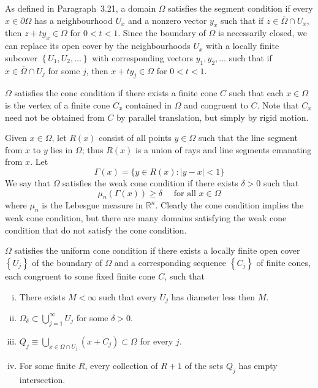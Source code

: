 \begin{para}
  As defined in Paragraph~3.21, a domain $\Omega$ satisfies the segment condition
  if every $x \in\partial\Omega$ has a neighbourhood $U_x$ and a nonzero vector $y_x$
  such that if $z \in \overline{\Omega} \cap U_x$, then $z+t y_x \in \Omega$ for $0<t<1$.
  Since the boundary of $\Omega$ is necessarily closed, we can replace its open cover by the 
  neighbourhoods $U_x$ with a locally finite subcover $\left\{U_1, U_2, \ldots\right\}$ with 
  corresponding vectors $y_1, y_2, \ldots$ such that if $x \in \overline{\Omega} \cap U_j$ for some 
  $j$, then $x+t y_j \in \Omega$ for $0<t<1$.
\end{para}


\begin{para}
  $\Omega$ satisfies the cone condition if there exists a finite cone $C$ such that
  each $x \in \Omega$ is the vertex of a finite cone $C_x$ contained in $\Omega$
  and congruent to $C$. Note that $C_x$ need not be obtained from $C$ by parallel translation,
  but simply by rigid motion.
\end{para}


\begin{para}
  Given $x \in \Omega$, let $R(x)$ consist of all points $y \in \Omega$ such that the line segment
  from $x$ to $y$ lies in $\Omega$; thus $R(x)$ is a union of rays and line segments emanating from $x$. Let
  \[
  \Gamma(x)=\{y \in R(x):|y-x|<1\}
  \]
  We say that $\Omega$ satisfies the weak cone condition if there exists $\delta>0$ such that
  \[
  \mu_n(\Gamma(x)) \geq \delta \quad \text { for all } x \in \Omega
  \]
  where $\mu_n$ is the Lebesgue measure in $\mathbb{R}^n$.
  Clearly the cone condition implies the 
  weak cone condition, but there are many domains satisfying the weak cone condition
  that do not satisfy the cone condition.
\end{para}


\begin{para}
  $\Omega$ satisfies the uniform cone condition if there exists a locally finite open cover
  $\left\{U_j\right\}$ of the boundary of $\Omega$ and a corresponding sequence
  $\left\{C_j\right\}$ of finite cones, each congruent to some fixed finite cone $C$, such that
  \begin{enumerate}[(i)]
    \item There exists $M<\infty$ such that every $U_j$ has diameter less then $M$.
    \item $\Omega_\delta \subset \bigcup_{j=1}^{\infty} U_j$ for some $\delta>0$.
    \item $Q_j \equiv \bigcup_{x \in \Omega \cap U_j}\left(x+C_j\right) \subset \Omega$
      for every $j$.
    \item For some finite $R$, every collection of $R+1$ of the sets $Q_j$ has empty intersection.
  \end{enumerate}
\end{para}


